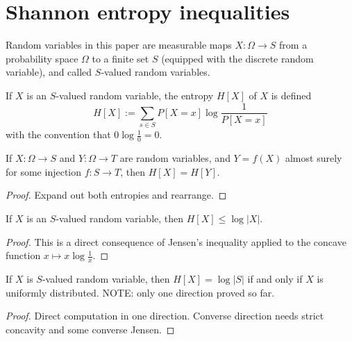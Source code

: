 \chapter{Shannon entropy inequalities}

Random variables in this paper are measurable maps $X : \Omega \to S$ from a probability space $\Omega$ to a finite set $S$ (equipped with the discrete random variable), and called $S$-valued random variables.

\begin{definition}[Entropy]
  \label{entropy-def}
  \leanok
  If $X$ is an $S$-valued random variable, the entropy $H[X]$ of $X$ is defined
  $$ H[X] := \sum_{s \in S} P[X=x] \log \frac{1}{P[X=x]}$$
  with the convention that $0 \log \frac{1}{0} = 0$.
\end{definition}

\begin{lemma}\label{relabeled-entropy}   If $X: \Omega \to S$ and $Y: \Omega \to T$ are random variables, and $Y = f(X)$ almost surely for some injection $f: S \to T$, then $H[X] = H[Y]$.
\end{lemma}

\begin{proof} Expand out both entropies and rearrange.
\end{proof}

\begin{lemma}\label{jensen-bound}
\leanok
If $X$ is an $S$-valued random variable, then $H[X] \leq \log |X|$.
\end{lemma}

\begin{proof}
  This is a direct consequence of Jensen's inequality applied to the concave function $x \mapsto x \log \frac{1}{x}$.
\end{proof}

\begin{lemma}\label{uniform-entropy}
If $X$ is $S$-valued random variable, then $H[X] = \log |S|$ if and only if $X$ is uniformly distributed. NOTE: only one direction proved so far.
\end{lemma}

\begin{proof} Direct computation in one direction.  Converse direction needs strict concavity and some converse Jensen.
\end{proof}

